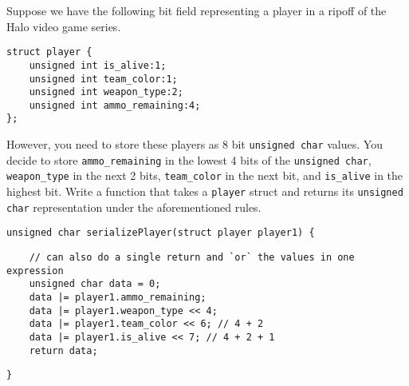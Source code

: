Suppose we have the following bit field representing a player in a ripoff of the Halo video game series.

\begin{verbatim}
struct player {
    unsigned int is_alive:1;
    unsigned int team_color:1;
    unsigned int weapon_type:2;
    unsigned int ammo_remaining:4;
};
\end{verbatim}

However, you need to store these players as 8 bit \texttt{unsigned char} values.
You decide to store \texttt{ammo_remaining} in the lowest 4 bits of the \texttt{unsigned char},
\texttt{weapon_type} in the next 2 bits,
\texttt{team_color} in the next bit,
and \texttt{is_alive} in the highest bit.
Write a function that takes a \texttt{player} struct and
returns its \texttt{unsigned char} representation under the aforementioned rules.

\begin{verbatim}
unsigned char serializePlayer(struct player player1) {
\end{verbatim}
\begin{answer}
\begin{verbatim}
    // can also do a single return and `or` the values in one expression
    unsigned char data = 0;
    data |= player1.ammo_remaining;
    data |= player1.weapon_type << 4;
    data |= player1.team_color << 6; // 4 + 2
    data |= player1.is_alive << 7; // 4 + 2 + 1
    return data;
\end{verbatim}
\end{answer}
\begin{verbatim}
}
\end{verbatim}
